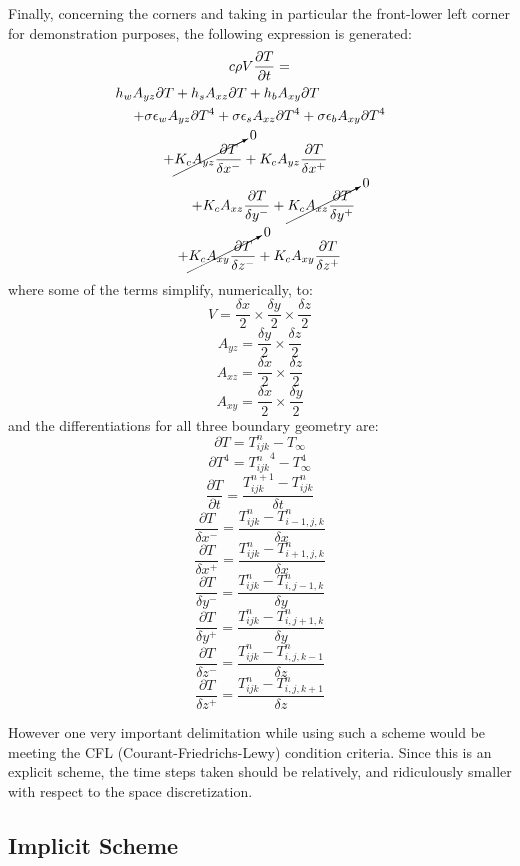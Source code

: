 \documentclass[a4paper,10pt]{IEEEtran}
\begin{document}
	Finally, concerning the corners and taking in particular the front-lower left corner for demonstration purposes, the following expression is generated:
	\begin{multline}
	c \rho V\frac{\partial T}{\partial t} = \\
	h_w A_{yz}\partial T + h_s A_{xz}\partial T + h_b A_{xy}\partial T \qquad \qquad \qquad\\
	+ \sigma \epsilon_w A_{yz}\partial T^4 + \sigma \epsilon_s A_{xz}\partial T^4 + \sigma \epsilon_b A_{xy}\partial T^4\\
	+ \cancelto{0}{K_c A_{yz}\frac{\partial T}{\delta x^-}} + K_c A_{yz}\frac{\partial T}{\delta x^+} \qquad\\
	\qquad + K_c A_{xz}\frac{\partial T}{\delta y^-} + \cancelto{0}{K_c A_{xz}\frac{\partial T}{\delta y^+}}\\
	+ \cancelto{0}{K_c A_{xy}\frac{\partial T}{\delta z^-}} + K_c A_{xy}\frac{\partial T}{\delta z^+}
	\end{multline}
	where some of the terms simplify, numerically, to:
	$$V = \frac{\delta x}{2} \times \frac{\delta y}{2} \times \frac{\delta z}{2} $$
	$$A_{yz} = \frac{\delta y}{2} \times \frac{\delta z}{2} $$
	$$A_{xz} = \frac{\delta x}{2} \times \frac{\delta z}{2} $$
	$$A_{xy} = \frac{\delta x}{2} \times \frac{\delta y}{2} $$
	and the differentiations for all three boundary geometry are:
	$$\partial T = T_{ijk}^n - T_\infty $$
	$$\partial T^4 = {T_{ijk}^n}^4 - T_\infty^4 $$
	$$\frac{\partial T}{\partial t} = \frac{T_{ijk}^{n+1} - T_{ijk}^n}{\delta t} $$
	$$\frac{\partial T}{\delta x^-} = \frac{T_{ijk}^n - T_{i-1,j,k}^n}{\delta x} $$
	$$\frac{\partial T}{\delta x^+} = \frac{T_{ijk}^n - T_{i+1,j,k}^n}{\delta x} $$
	$$\frac{\partial T}{\delta y^-} = \frac{T_{ijk}^n - T_{i,j-1,k}^n}{\delta y} $$
	$$\frac{\partial T}{\delta y^+} = \frac{T_{ijk}^n - T_{i,j+1,k}^n}{\delta y} $$
	$$\frac{\partial T}{\delta z^-} = \frac{T_{ijk}^n - T_{i,j,k-1}^n}{\delta z} $$
	$$\frac{\partial T}{\delta z^+} = \frac{T_{ijk}^n - T_{i,j,k+1}^n}{\delta z} $$

	
	However one very important delimitation while using such a scheme would be meeting the CFL (Courant-Friedrichs-Lewy) condition criteria. Since this is an explicit scheme, the time steps taken should be relatively, and ridiculously smaller with respect to the space discretization. 
	
	
	\subsection{Implicit Scheme} 
	
\end{document}
